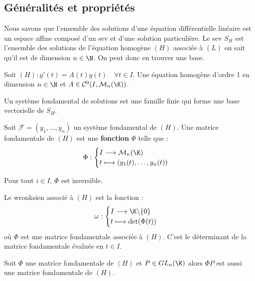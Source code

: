 \subsection{Généralités et propriétés} 

Nous savons que l'ensemble des solutions d'une équation différentielle linéaire est un 
espace affine composé d'un sev et d'une solution particulière. 
Le sev $S_H$ est l'ensemble des solutions de l'équation homogène $(H)$ associée à $(L)$ 
on sait qu'il est de dimension $n \in \N$. On peut donc en trouver une base. 

\vspace{0.3cm}

Soit $(H) : y'(t) = A(t) y(t) \quad \forall t \in I$. Une équation homogène d'ordre 1
en dimension $n \in  \N$ et $A \in \mathcal{C}^0(I, \mathcal{M}_n(\K))$.   

\begin{definition}
	Un système fondamental de solutions est une famille finie qui forme une base 
	vectorielle de $S_H$. 
\end{definition} 

\begin{definition}
	Soit $ \mathcal{F} = (y_1, \dots, y_n)$ un système fondamental de $(H)$. 
	Une matrice fondamentale de $(H)$ est une \textbf{fonction} $\Phi$ telle que : 
		\[ \Phi : 
			\begin{cases}
				I \longrightarrow \mathcal{M}_n(\K) \\ 
				t \longmapsto (y_1(t), \dots, y_n(t))
			\end{cases}  \]	
\end{definition} 

\begin{remark}
	Pour tout $ i \in  I$, $\Phi$ est inversible. 
\end{remark} 

\begin{definition}[Wronksien]
	Le wronksien associé à $(H)$ est la fonction : 
		\[ \omega : 
			\begin{cases}
				I \longrightarrow \K \backslash \{0\} \\ 
				t \longmapsto \det (\Phi(t))
			\end{cases} \]
	où $\Phi$ est une matrice fondamentale associée à $(H)$.
	C'est le déterminant de la matrice fondamentale évaluée en $t \in  I$. 
\end{definition} 

\begin{remark} 
	Soit $\Phi$ une matrice fondamentale de $(H)$ et $P \in  GL_n(\K)$ alors $\Phi P$ est aussi 
	une matrice fondamentale de $(H)$. 
\end{remark} 

